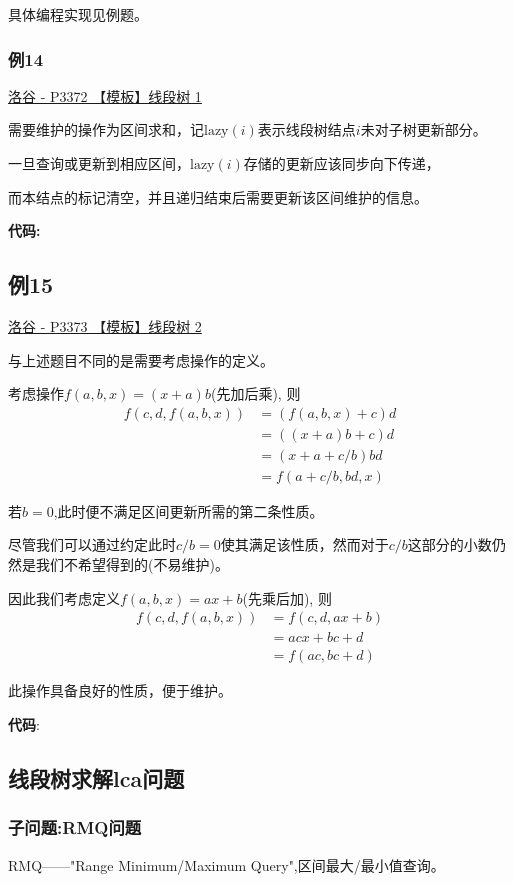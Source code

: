 \documentclass{article}
\newcommand{\inputcppfile}[1]{}
\begin{document}
具体编程实现见例题。

\subsubsection{例14}
\href{https://www.luogu.com.cn/problem/P3372}{洛谷 - P3372 【模板】线段树 1}

需要维护的操作为区间求和，记$\text{lazy}(i)$表示线段树结点$i$未对子树更新部分。

一旦查询或更新到相应区间，$\text{lazy}(i)$存储的更新应该同步向下传递，

而本结点的标记清空，并且递归结束后需要更新该区间维护的信息。

\textbf{代码:}
\inputcppfile{Code_14.cpp}

\subsection{例15}
\href{https://www.luogu.com.cn/problem/P3373}{洛谷 - P3373 【模板】线段树 2}

与上述题目不同的是需要考虑操作的定义。

考虑操作$f(a,b,x) = (x + a)b$(先加后乘), 则
\begin{align*}
    f(c,d,f(a,b,x)) &= (f(a,b,x)+c)d \\
    &= ((x+a)b + c)d \\
    &= (x+a + c/b)bd \\ 
    &= f(a+c/b,bd,x)
\end{align*}

若$b = 0$,此时便不满足区间更新所需的第二条性质。

尽管我们可以通过约定此时$c/b = 0$使其满足该性质，然而对于$c/b$这部分的小数仍然是我们不希望得到的(不易维护)。

因此我们考虑定义$f(a,b,x) = ax+b$(先乘后加), 则
\begin{align*}
    f(c,d,f(a,b,x)) &= f(c,d,ax+b) \\
    &= acx + bc+d \\
    &= f(ac,bc+d) 
\end{align*}

此操作具备良好的性质，便于维护。

\textbf{代码}:
\inputcppfile{Code_15.cpp}

\subsection{线段树求解lca问题}
\subsubsection{子问题:RMQ问题}
RMQ——"Range Minimum/Maximum Query",区间最大/最小值查询。
\end{document}
